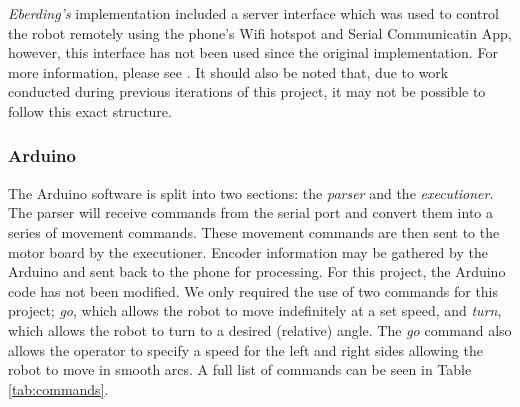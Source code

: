 \documentclass[a4paper,11pt,twoside,openright]{article}
\begin{document}
\textit{Eberding's} implementation included a server interface which was used to control the robot
remotely
using the phone's Wifi hotspot and Serial Communicatin App, however, this interface has not been used
since the original implementation. For more information, please see \cite{Eberding2016}. It should
also be noted that, due to work conducted during previous iterations of this project, it may not
be possible to follow this exact structure.


\subsubsection{Arduino}
The Arduino software is split into two sections: the \textit{parser} and the \textit{executioner}\cite{Eberding2016}.
The parser will receive commands from the serial port and convert them into a series of movement
commands. These movement commands are then sent to the motor board by the executioner. Encoder
information may be gathered by the Arduino and sent back to the phone for processing.
For this project,
the Arduino code has not been modified. We only required the use of two commands for this project;
\textit{go}, which allows the robot to move indefinitely at a set speed, and \textit{turn}, which
allows the robot to turn to a desired (relative) angle. The \textit{go} command also allows the
operator to specify a speed for the left and right sides allowing the robot to move in smooth arcs.
A full list of commands can be seen in Table \ref{tab:commands}.
\end{document}
